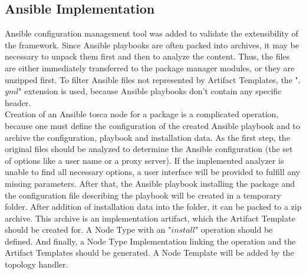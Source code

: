\subsection*{Ansible Implementation}
Ansible configuration management tool was added to validate the extensibility of the framework.
Since Ansible playbooks are often packed into archives, it may be necessary to unpack them first and then to analyze the content.
Thus, the files are either immediately transferred to the package manager modules, or they are unzipped first.
To filter Ansible files not represented by Artifact Templates, the ".$yml$" extension is used, because Ansible playbooks don't contain any specific header.\\
Creation of an Ansible \gls{tosca} node for a package is a complicated operation, because one must define the configuration of the created Ansible playbook and to archive the configuration, playbook and installation data. 
As the first step, the original files should be analyzed to determine the Ansible configuration (the set of options like a user name or a proxy server).
If the implemented analyzer is unable to find all necessary options, a user interface will be provided to fulfill any missing parameters.
After that, the Ansible playbook installing the package and the configuration file describing the playbook will be created in a temporary folder.
After addition of installation data into the folder, it can be packed to a zip archive.
This archive is an implementation artifact, which the Artifact Template should be created for.
A Node Type with an "$install$" operation %
should be defined.
And finally, a Node Type Implementation linking the operation and the Artifact Templates should be generated.
A Node Template will be added by the topology handler.
%	
